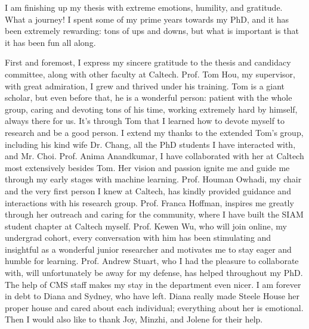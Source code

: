 \documentclass[12pt]{caltech_thesis}
\numberwithin{equation}{section}
\begin{document}
\begin{acknowledgements} 	
I am finishing up my thesis with extreme emotions, humility, and gratitude. What a journey! I spent some of my prime years towards my PhD, and it has been extremely rewarding: tons of ups and downs, but what is important is that it has been fun all along.

First and foremost, I express my sincere gratitude to the thesis and candidacy committee, along with other faculty at Caltech. Prof. Tom Hou, my supervisor, with great admiration, I grew and thrived under his training. Tom is a giant scholar, but even before that, he is a wonderful person: patient with the whole group, caring and devoting tons of his time, working extremely hard by himself, always there for us. It's through Tom that I learned how to devote myself to research and be a good person. I extend my thanks to the extended Tom's group, including his kind wife Dr. Chang, all the PhD students I have interacted with, and Mr. Choi. Prof. Anima Anandkumar, I have collaborated with her at Caltech most extensively besides Tom. Her vision and passion ignite me and guide me through my early stages with machine learning. Prof. Houman Owhadi, my chair and the very first person I knew at Caltech, has kindly provided guidance and interactions with his research group. Prof. Franca Hoffman, inspires me greatly through her outreach and caring for the community, where I have built the SIAM student chapter at Caltech myself. Prof. Kewen Wu, who will join online, my undergrad cohort, every conversation with him has been stimulating and insightful as a wonderful junior researcher and motivates me to stay eager and humble for learning. Prof. Andrew Stuart, who I had the pleasure to collaborate with, will unfortunately be away for my defense, has helped throughout my PhD.
   The help of CMS staff makes my stay in the department even nicer. I am forever in debt to Diana and Sydney, who have left. Diana really made Steele House her proper house and cared about each individual; everything about her is emotional. Then I would also like to thank Joy, Minzhi, and Jolene for their help.


\end{acknowledgements}
\end{document}
